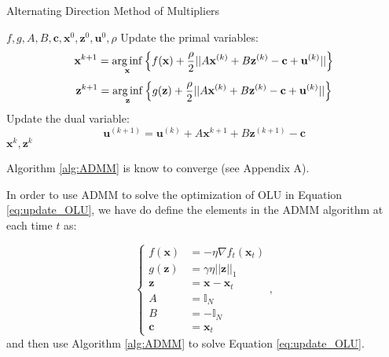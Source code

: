 \begin{algorithm}[!ht]
    \caption{Alternating Direction Method of Multipliers}
    \label{alg:ADMM}
    \begin{algorithmic}[1]
    \REQUIRE $f,g,A,B,\mathbf c,\mathbf x^0,\mathbf z^0,\mathbf u^0,\rho$ \nonumber
    \STATE Update the primal variables: 
    $$\mathbf x^{k+1}=\operatorname*{arg\,inf}\limits_{\mathbf x}\left\{f(\mathbf x)+\frac{\rho}{2}||A\mathbf x^{(k)}+B\mathbf z^{(k)}-\mathbf c+\mathbf u^{(k)}||\right\}$$
    $$\mathbf z^{k+1}=\operatorname*{arg\,inf}\limits_{\mathbf z }\left\{g(\mathbf z)+\frac{\rho}{2}||A\mathbf x^{(k)}+B\mathbf z^{(k)}-\mathbf c+\mathbf u^{(k)}||\right\}$$
    \STATE Update the dual variable: 
    $$\mathbf u^{(k+1)}=\mathbf u^{(k)}+A\mathbf x^{k+1}+B\mathbf z^{(k+1)}-\mathbf c$$
    \ENDWHILE
    \RETURN $\mathbf x^k,\mathbf z^k$
    \end{algorithmic}
\end{algorithm}

Algorithm \ref{alg:ADMM} is know to converge (see \cite{boyd2011distributed} Appendix A).

In order to use ADMM to solve the optimization of OLU in Equation \eqref{eq:update_OLU}, we have do define the elements in the ADMM algorithm at each time $t$ as:

\begin{equation}
\begin{cases}
f(\mathbf x)&=-\eta\nabla f_t(\mathbf x_t)\\
g(\mathbf z)&=\gamma\eta||\mathbf z||_1 \\
\mathbf z&=\mathbf x-\mathbf x_t\\
A&=\mathbb I_N\\
B&=-\mathbb I_N\\
\mathbf c&=\mathbf x_t
\end{cases},
\end{equation}
and then use Algorithm \ref{alg:ADMM} to solve Equation \eqref{eq:update_OLU}.





